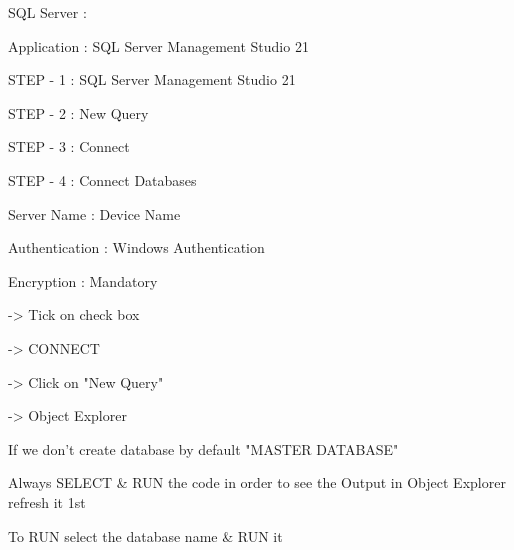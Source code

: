 SQL Server :

Application : SQL Server Management Studio 21

STEP - 1 : SQL Server Management Studio 21

STEP - 2 : New Query

STEP - 3 : Connect

STEP - 4 : Connect Databases


Server Name : Device Name

Authentication : Windows Authentication

Encryption : Mandatory

-> Tick on check box

-> CONNECT

-> Click on "New Query"

-> Object Explorer


If we don't create database by default "MASTER DATABASE"


Always SELECT & RUN the code in order to see the Output in Object Explorer refresh it 1st


To RUN select the database name & RUN it
